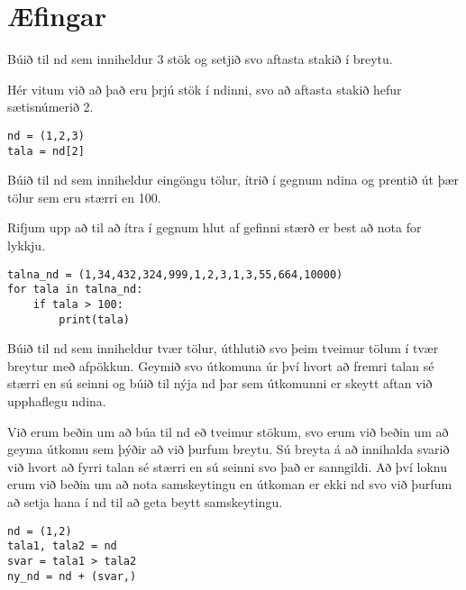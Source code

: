 \newpage
\section{Æfingar}
\begin{exercise}\label{nd1}
Búið til nd sem inniheldur 3 stök og setjið svo aftasta stakið í breytu.
\end{exercise}
\begin{Answer}[ref={nd1}]
Hér vitum við að það eru þrjú stök í ndinni, svo að aftasta stakið hefur sætisnúmerið 2.
\begin{lstlisting}
nd = (1,2,3)
tala = nd[2]\end{lstlisting}
\end{Answer}

\begin{exercise}\label{nd2}
Búið til nd sem inniheldur eingöngu tölur, ítrið í gegnum ndina og prentið út þær tölur sem eru stærri en 100.
\end{exercise}
\begin{Answer}[ref={nd2}]
Rifjum upp að til að ítra í gegnum hlut af gefinni stærð er best að nota for lykkju.
\begin{lstlisting}
talna_nd = (1,34,432,324,999,1,2,3,1,3,55,664,10000)
for tala in talna_nd:
	if tala > 100:
		print(tala)\end{lstlisting}
\end{Answer}

\begin{exercise}\label{nd3}
Búið til nd sem inniheldur tvær tölur, úthlutið svo þeim tveimur tölum í tvær breytur með afpökkun.
Geymið svo útkomuna úr því hvort að fremri talan sé stærri en sú seinni og búið til nýja nd þar sem útkomunni er skeytt aftan við upphaflegu ndina.
\end{exercise}
\begin{Answer}[ref={nd3}]
Við erum beðin um að búa til nd eð tveimur stökum, svo erum við beðin um að geyma útkomu sem þýðir að við þurfum breytu.
Sú breyta á að innihalda svarið við hvort að fyrri talan sé stærri en sú seinni svo það er sanngildi.
Að því loknu erum við beðin um að nota samskeytingu en útkoman er ekki nd svo við þurfum að setja hana í nd til að geta beytt samskeytingu.
	\begin{lstlisting}
nd = (1,2)
tala1, tala2 = nd
svar = tala1 > tala2
ny_nd = nd + (svar,)\end{lstlisting}
\end{Answer}

